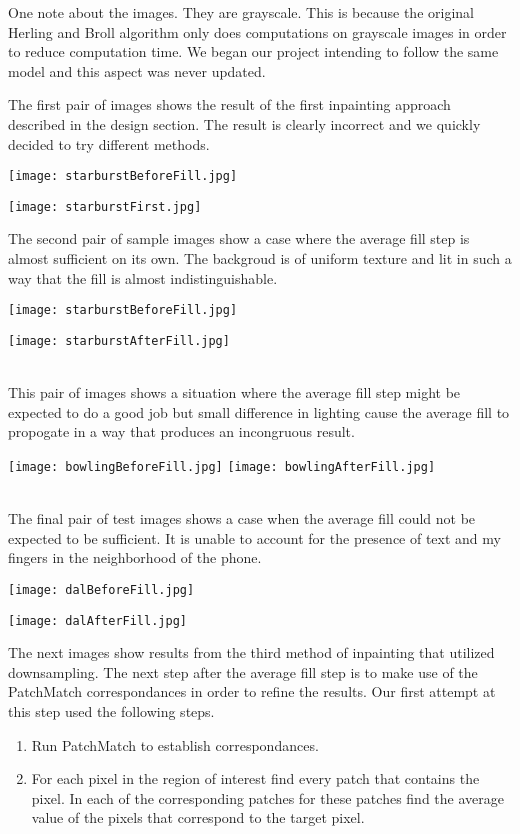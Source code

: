 \documentclass[12pt]{article}
\begin{document}
One note about the images. They are grayscale. This is because the original Herling and Broll algorithm only does computations on grayscale images in order to reduce computation time. We began our project intending to follow the same model and this aspect was never updated. 

The first pair of images shows the result of the first inpainting approach described in the design section. The result is clearly incorrect and we quickly decided to try different methods.
\begin{center}
\texttt{[image: starburstBeforeFill.jpg]}

\texttt{[image: starburstFirst.jpg]}
\end{center}

The second pair of sample images show a case where the average fill step is almost sufficient on its own. The backgroud is of uniform texture and lit in such a way that the fill is almost indistinguishable.

\begin{center}
\texttt{[image: starburstBeforeFill.jpg]}

\texttt{[image: starburstAfterFill.jpg]}
\end{center}
\\

This pair of images shows a situation where the average fill step might be expected to do a good job but small difference in lighting cause the average fill to propogate in a way that produces an incongruous result.

\begin{center}
\texttt{[image: bowlingBeforeFill.jpg]}
\texttt{[image: bowlingAfterFill.jpg]}
\end{center}\\

The final pair of test images shows a case when the average fill could not be expected to be sufficient. It is unable to account for the presence of text and my fingers in the neighborhood of the phone.

\begin{center}
\texttt{[image: dalBeforeFill.jpg]}

\texttt{[image: dalAfterFill.jpg]}
\end{center}

The next images show results from the third method of inpainting that utilized downsampling.
The next step after the average fill step is to make use of the PatchMatch correspondances in order to refine the results. Our first attempt at this step used the following steps.
\begin{enumerate}
    \item Run PatchMatch to establish correspondances.
    \item For each pixel in the region of interest find every patch that contains the pixel. In each of the corresponding patches for these patches find the average value of the pixels that correspond to the target pixel.
\end{enumerate}
\end{document}

